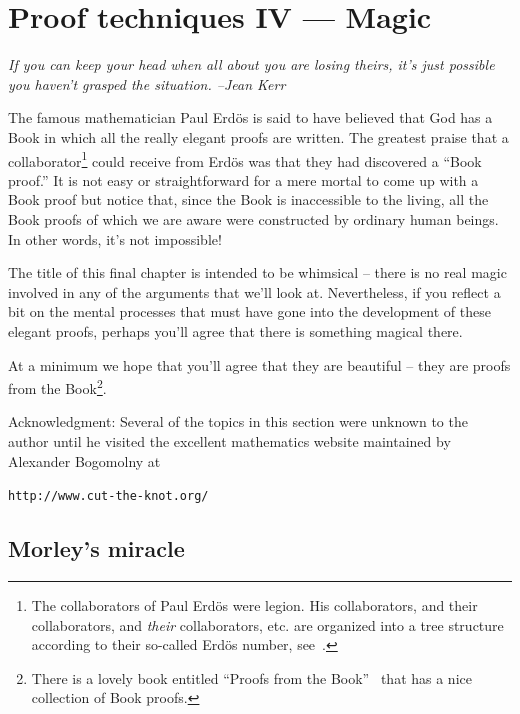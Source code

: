 
\chapter{Proof techniques IV --- Magic}
\label{ch:magic}

{\em If you can keep your head when all about you are losing theirs, it's 
just possible you haven't grasped the situation. --Jean Kerr} 

\vspace{.3in}

The famous mathematician 
 Paul Erd\"{o}s is said to have believed that
God has a Book in which all the really elegant proofs are written.
The greatest praise that a collaborator\footnote{The collaborators
of Paul Erd\"{o}s were legion.  His collaborators, and their collaborators,
and \emph{their} collaborators, etc. are organized into a tree structure 
according to their so-called Erd\"{o}s number,
see~\cite{wiki-Erdos_number}.} could receive from Erd\"{o}s
was that they had discovered a ``Book proof.''   It is not
easy or straightforward for a mere mortal to come up with a Book 
proof but notice that, since the Book is inaccessible to the living,
all the Book proofs of which we are aware were constructed by ordinary
human beings.  In other words, it's not impossible!

The title of this final chapter is intended to be whimsical -- there
is no real magic involved in any of the arguments that we'll look at.  
Nevertheless, if you  reflect a bit on the mental processes that 
must have gone into the development of these elegant proofs, perhaps
you'll agree that there is something magical there.   

At a minimum
we hope that you'll agree that they are beautiful -- they are proofs
from the Book\footnote{There is a lovely book entitled ``Proofs from the
Book''~\cite{pftB} that has a nice collection of Book proofs.}.

Acknowledgment: Several of the topics in this section were unknown to
the author until he visited the excellent mathematics website maintained
by Alexander Bogomolny at

\verb+http://www.cut-the-knot.org/+

\clearpage

\section{Morley's miracle}

